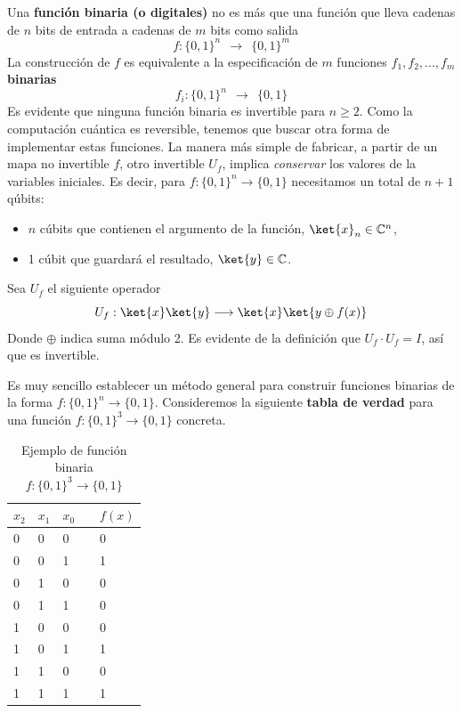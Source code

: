 \documentclass[a4paper,11pt]{book} %
\numberwithin{equation}{chapter}
\begin{document}
Una \textbf{función binaria (o digitales)} no es más que una función que lleva cadenas de $n$ bits de entrada a cadenas de $m$ bits como salida
$$
f : \{0,1\}^n ~~\to ~~\{0,1\}^m
$$
La construcción de $f$ es equivalente a la especificación de $m$ funciones  $f_1,f_2,...,f_m$ \textbf{binarias}
$$
f_i : \{0,1\}^n ~~\to ~~\{0,1\}
$$ 
Es evidente que ninguna función binaria es invertible para $n\geq 2$. Como la computación cuántica es reversible, tenemos que buscar otra forma de implementar estas funciones. La manera más simple de fabricar, a partir de un mapa no invertible $f$, otro invertible $U_f$, implica \textit{conservar} los valores de la variables iniciales. Es decir, para $f:\{0,1\}^n \to \{0,1\}$ necesitamos un total de $n+1$ qúbits:
\begin{itemize}
	\item $n$ cúbits que contienen el argumento de la función, $\ket{x}_n \in \mathbb{C}^n$, 
	\item 1 cúbit que guardará el resultado, $\ket{y} \in \mathbb{C}$.
\end{itemize}
Sea $U_f$ el siguiente operador
	\begin{equation} \label{ec_InicialOracle_Uf}
	U_f : \ket{x}\ket{y} \longrightarrow \ket{x} \ket{ y \oplus f(x) }
	\end{equation}
Donde $\oplus$ indica suma módulo 2. Es evidente de la definición que $U_f\cdot U_f = I$, así que es invertible.

Es muy sencillo establecer un método general para construir funciones binarias de la forma $f: \{0, 1\}^n \rightarrow \{0, 1\}$. Consideremos la siguiente \textbf{tabla de verdad} para una función $f: \{0, 1\}^3 \rightarrow \{0, 1\}$ concreta.

\begin{table}[H]
\centering
\begin{tabular}{lllll}
$x_2$ & $x_1$ & $x_0$ & & $f(x)$ \\ \hline
 0&0&0 &&0\\
 0&0&1 &&1\\
 0&1&0 &&0\\
 0&1&1 &&0\\
 1&0&0 &&0\\
 1&0&1 &&1\\
 1&1&0 &&0\\
 1&1&1 &&1\\ \hline
\end{tabular}
\caption{Ejemplo de función binaria $f: \{0, 1\}^3 \rightarrow \{0, 1\}$}
\label{Tab_InitialOracle_f_bin_1}
\end{table}
\end{document}
